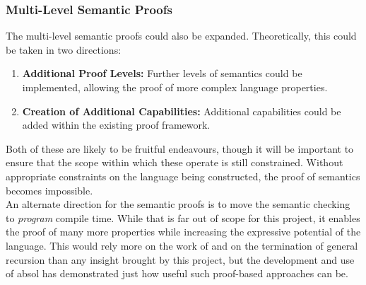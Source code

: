 
\subsubsection{Multi-Level Semantic Proofs} %
\label{ssub:multi_level_semantic_proofs}
The multi-level semantic proofs could also be expanded.
Theoretically, this could be taken in two directions:
\begin{enumerate}
    \item \textbf{Additional Proof Levels:} Further levels of semantics could be implemented, allowing the proof of more complex language properties.
    \item \textbf{Creation of Additional Capabilities:} Additional capabilities could be added within the existing proof framework.
\end{enumerate}

Both of these are likely to be fruitful endeavours, though it will be important to ensure that the scope within which these operate is still constrained.
Without appropriate constraints on the language being constructed, the proof of semantics becomes impossible.\\

An alternate direction for the semantic proofs is to move the semantic checking to \textit{program} compile time.
While that is far out of scope for this project, it enables the proof of many more properties while increasing the expressive potential of the language.
This would rely more on the work of \citet{hinze2010reasoning} and \citet{nordstrom1988terminating} on the termination of general recursion than any insight brought by this project, but the development and use of \gls{absol} has demonstrated just how useful such proof-based approaches can be.



